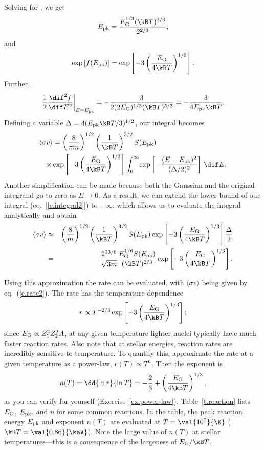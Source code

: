 \begin{sidebar}
Solving for \Epk, we get
\[
\Epk = \frac{\EG^{1/3}(\kB T)^{2/3}}{2^{2/3}},
\]
and 
\[ \exp\left[f(\Epk)\right] = \exp\left[-3\left(\frac{\EG}{4\kB T}\right)^{1/3}\right].
\]
Further,
\[
\left.\frac{1}{2}\frac{\dif^{2}f}{\dif E^{2}}\right|_{E=\Epk} = -\frac{3}{2(2\EG)^{1/3}(\kB T)^{5/3}} = -\frac{3}{4\Epk \kB T}.
\]
Defining a variable $\Delta = 4(\Epk \kB T/3)^{1/2}$, our integral becomes
\begin{eqnarray}\label{e.integral2}
\lefteqn{\langle\sigma v\rangle = \left(\frac{8}{\pi m}\right)^{1/2}\left(\frac{1}{\kB T}\right)^{3/2} S(\Epk)} \nonumber\\
&&\times 
  \exp\left[-3\left(\frac{\EG}{4\kB T}\right)^{1/3}\right]\int_{0}^{\infty}\!\exp\left[-\frac{(E-\Epk)^{2}}{(\Delta/2)^{2}}\right]\,\dif E.
\end{eqnarray}
Another simplification can be made because both the Gaussian and the original integrand go to zero as $E\to 0$.  As a result, we can extend the lower bound of our integral (eq.~[\ref{e.integral2}]) to $-\infty$, which allows us to evaluate the integral analytically and obtain
\begin{eqnarray}\label{e.rate2}
\langle\sigma v\rangle &\approx& \left(\frac{8}{m}\right)^{1/2}\left(\frac{1}{\kB T}\right)^{3/2} S(\Epk) \exp\left[-3\left(\frac{\EG}{4\kB T}\right)^{1/3}\right] \frac{\Delta}{2}\nonumber\\
 &=& \frac{2^{13/6}}{\sqrt{3m}}\frac{\EG^{1/6}S(\Epk)}{(\kB T)^{2/3}} \exp\left[-3\left(\frac{\EG}{4\kB T}\right)^{1/3}\right]  .
\end{eqnarray}
\end{sidebar}

Using this approximation the rate can be evaluated, with $\langle\sigma v\rangle$ being given by eq.~(\ref{e.rate2}). The rate has the temperature dependence
\[
	r \propto T^{-2/3} \exp\left[-3\left(\frac{\EG}{4\kB T}\right)^{1/3}\right];
\]
since $E_{\mathrm{G}} \propto Z_{1}^{2}Z_{2}^{2}A$, at any given temperature lighter nuclei typically have much faster reaction rates. Also note that at stellar energies, reaction rates are incredibly sensitive to temperature. To quantify this, approximate the rate at a given temperature as a power-law, $r(T)\propto T^{n}$. Then the exponent is
\begin{equation}\label{e.exponent}
 n(T) = \dd{\ln r}{\ln T} = -\frac{2}{3} + \left(\frac{\EG}{4\kB T}\right)^{1/3},
\end{equation}
as you can verify for yourself (Exercise~\ref{ex.power-law}). Table~\ref{t.reaction} lists $E_{\mathrm{G}}$, $E_{\mathrm{pk}}$, and $n$ for some common reactions. 
In the table, the peak reaction energy $E_{\mathrm{pk}}$ and exponent $n(T)$ are evaluated at $T = \val{10^{7}}{\K}$ ($\kB T = \val{0.86}{\keV}$). Note the large value of $n(T)$ at stellar temperatures---this is a consequence of the largeness of $\EG/\kB T$.
 
